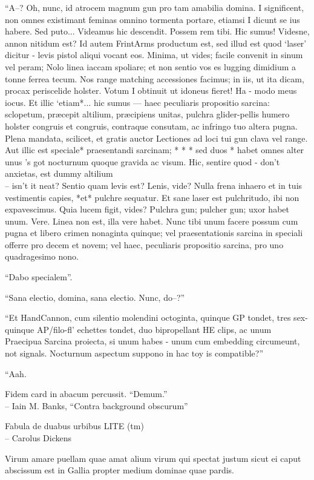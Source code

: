 \documentclass[titlepage,12pt]{memoir}
\begin{document}
“A--? Oh, nunc, id atrocem magnum gun pro tam amabilia domina. I
significent, non omnes existimant feminas omnino tormenta portare, etiamsi I
dicunt se ius habere. Sed puto... Videamus
hic descendit. Possem rem tibi. Hic sumus!
Videsne, annon nitidum est? Id autem FrintArms productum est,
sed illud est quod ‘laser’ dicitur - levis pistol aliqui vocant
eos. Minima, ut vides; facile convenit in sinum vel peram; Nolo
linea iaccam spoliare; et non sentio vos es lugging dimidium a
tonne ferrea tecum. Nos range matching accessiones facimus;
in iis, ut ita dicam, procax periscelide holster. Votum I
obtinuit ut idoneus fieret! Ha - modo meus iocus. Et
illic ‘etiam*... hic sumus — haec peculiaris propositio sarcina: sclopetum,
præcepit altilium, præcipiens unitas, pulchra glider-pellis humero holster
congruis et congruis, contraque consutam, ac infringo tuo
altera pugna. Plena mandata, scilicet, et gratis auctor
Lectiones ad loci tui gun clava vel range. Aut illic est speciale*
praesentandi sarcinam; * * * sed duos * habet omnes alter unus ’s got
nocturnum quoque gravida ac visum. Hic, sentire quod - don’t
anxietas, est dummy altilium \\-- isn’t it neat? Sentio quam levis est?
Lenis, vide? Nulla frena inhaero et in tuis vestimentis capies, *et*
pulchre sequatur. Et sane laser est pulchritudo, ibi
non expavescimus. Quia lucem figit, vides? Pulchra gun;
pulcher gun; uxor habet unum. Vere. Linea non est, illa
vere habet. Nunc tibi unum facere possum cum pugna et libero
crimen nonaginta quinque; vel praesentationis sarcina in speciali
offerre pro decem et novem; vel haec, peculiaris propositio sarcina, pro
uno quadragesimo nono.

“Dabo specialem”.

“Sana electio, domina, sana electio. Nunc, do--?”

“Et HandCannon, cum silentio molendini octoginta, quinque GP tondet, tres
sex-quinque AP/filo-fl’ echettes tondet, duo bipropellant HE clips, ac unum
Praecipua Sarcina proiecta, si unum habes - unum cum embedding
circumeunt, not signals. Nocturnum aspectum suppono in hac toy is
compatible?”

“Aah.

Fidem card in abacum percussit. “Demum.”
\\-- Iain M. Banks, “Contra background obscurum”

Fabula de duabus urbibus LITE (tm)
\\-- Carolus Dickens

Virum amare puellam quae amat alium virum qui spectat justum
sicut ei caput abscissum est in Gallia propter medium
dominae quae pardis.
\end{document}
